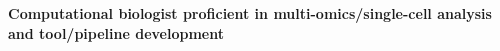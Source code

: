 \documentclass[letterpaper,11pt]{my-cv}
\begin{document}

\vspace{2ex}

{
    \small\lightsourceserif\bfseries\color{color-title}
    Computational biologist proficient in multi-omics/single-cell analysis and tool/pipeline development\par
}







% 
% 
\end{document}
